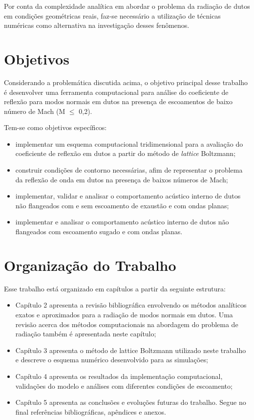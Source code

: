 Por conta da complexidade analítica em abordar o problema da radiação de dutos em condições geométricas reais, faz-se necessário a utilização de técnicas numéricas como alternativa na investigação desses fenômenos.


\section{Objetivos}

Considerando a problemática discutida acima, o objetivo principal desse trabalho é desenvolver uma ferramenta computacional para análise do coeficiente de reflexão para modos normais em dutos na presença de escoamentos de baixo número de Mach (M $\leq$ 0,2).

Tem-se como objetivos específicos:
\begin{itemize}
    \item implementar um esquema computacional tridimensional para a avaliação do coeficiente de reflexão em dutos a partir do método de \textit{lattice} Boltzmann;
    \item construir condições de contorno necessárias, afim de representar o problema da reflexão de onda em dutos na presença de baixos números de Mach;
    \item implementar, validar e analisar o comportamento acústico interno de dutos não flangeados com e sem escoamento de exaustão e com ondas planas;
    \item implementar e analisar o comportamento acústico interno de dutos não flangeados com escoamento sugado e com ondas planas.
\end{itemize}

\section{Organização do Trabalho}

Esse trabalho está organizado em capítulos a partir da seguinte estrutura: 

\begin{itemize}
	\item Capítulo 2 apresenta a revisão bibliográfica envolvendo os métodos analíticos exatos e aproximados para a radiação de modos normais em dutos. Uma revisão acerca dos métodos computacionais na abordagem do problema de radiação também é apresentada neste capítulo;
	\item Capítulo 3 apresenta o método de lattice Boltzmann utilizado neste trabalho e descreve o esquema numérico desenvolvido para as simulações;
	\item Capítulo 4 apresenta os resultados da implementação computacional, validações do modelo e análises com diferentes condições de escoamento;
	\item Capítulo 5 apresenta as conclusões e evoluções futuras do trabalho. Segue no final referências bibliográficas, apêndices e anexos.
\end{itemize}